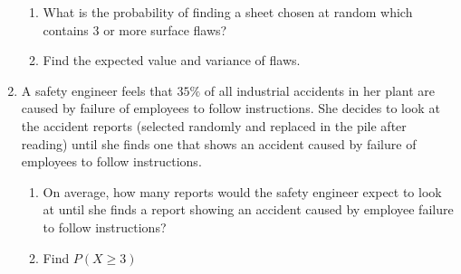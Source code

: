 \documentclass[11pt]{article}\usepackage[]{graphicx}\usepackage[]{color}
\begin{document}
\begin{enumerate}
\begin{enumerate}
            \item What is the probability of finding a sheet chosen at random which contains 3 or more surface flaws?
            \vspace{1.5cm}
            \item Find the expected value and variance of flaws.
        \end{enumerate}
        
  \item A safety engineer feels that $35\%$ of all industrial accidents in her plant are caused by failure of employees to follow instructions. She decides to look at the accident reports (selected randomly and replaced in the pile after reading) until she finds one that shows an accident caused by failure of employees to follow instructions. 
      \begin{enumerate}
      \item On average, how many reports would the safety engineer expect to look at until she finds a report showing an accident caused by employee failure to follow instructions? 

      \item  Find $P(X\ge 3)$
      \end{enumerate}



   \end{enumerate}
\end{document}
